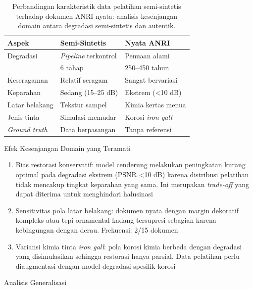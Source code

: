 \documentclass[12pt,a4paper]{article}
\begin{document}
\begin{table}[!t]
\renewcommand{\arraystretch}{1.15}
\caption[Perbandingan karakteristik data pelatihan semi-sintetis]{Perbandingan karakteristik data pelatihan semi-sintetis terhadap dokumen ANRI nyata: analisis kesenjangan domain antara degradasi semi-sintetis dan autentik.}
\label{table:synthetic_vs_real_comparison}
\centering
\begin{tabular}{|p{2.5cm}|p{2.8cm}|p{2.8cm}|}
\hline
\textbf{Aspek} & \textbf{Semi-Sintetis} & \textbf{Nyata ANRI} \\
\hline
Degradasi & \textit{Pipeline} terkontrol & Penuaan alami \\
& 6 tahap & 250--450 tahun \\
\hline
Keseragaman & Relatif seragam & Sangat bervariasi \\
\hline
Keparahan & Sedang (15--25 dB) & Ekstrem (<10 dB) \\
\hline
Latar belakang & Tekstur sampel & Kimia kertas menua \\
\hline
Jenis tinta & Simulasi memudar & Korosi \textit{iron gall} \\
\hline
\textit{Ground truth} & Data berpasangan & Tanpa referensi \\
\hline
\end{tabular}
\end{table}

Efek Kesenjangan Domain yang Teramati
\begin{enumerate}[nosep]
    \item Bias restorasi konservatif: model cenderung melakukan peningkatan kurang optimal pada degradasi ekstrem (PSNR <10 dB) karena distribusi pelatihan tidak mencakup tingkat keparahan yang sama. Ini merupakan \textit{trade-off} yang dapat diterima untuk menghindari halusinasi
    
    \item Sensitivitas pola latar belakang: dokumen nyata dengan margin dekoratif kompleks atau tepi ornamental kadang tersupresi sebagian karena kebingungan dengan derau. Frekuensi: 2/15 dokumen
    
    \item Variansi kimia tinta \textit{iron gall}: pola korosi kimia berbeda dengan degradasi yang disimulasikan sehingga restorasi hanya parsial. Data pelatihan perlu diaugmentasi dengan model degradasi spesifik korosi
\end{enumerate}

Analisis Generalisasi
\end{document}

